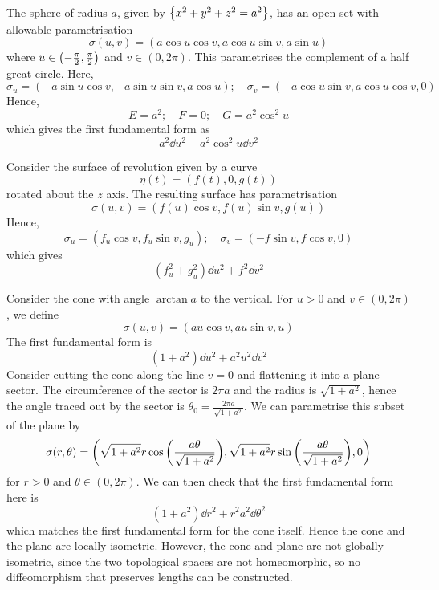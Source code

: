 \documentclass[a4paper,11pt]{article}
\begin{document}
\begin{example}
	The sphere of radius \( a \), given by \( \qty{x^2 + y^2 + z^2 = a^2} \), has an open set with allowable parametrisation
	\[
		\sigma(u,v) = (a\cos u \cos v, a \cos u \sin v, a \sin u)
	\]
	where \( u \in \qty(-\frac{\pi}{2}, \frac{\pi}{2}) \) and \( v \in (0,2\pi) \).
	This parametrises the complement of a half great circle.
	Here,
	\[
		\sigma_u = (-a \sin u \cos v, -a \sin u \sin v, a \cos u);\quad \sigma_v = (-a \cos u \sin v, a \cos u \cos v, 0)
	\]
	Hence,
	\[
		E = a^2; \quad F = 0;\quad G = a^2 \cos^2 u
	\]
	which gives the first fundamental form as
	\[
		a^2 \dd{u}^2 + a^2 \cos^2 u \dd{v}^2
	\]
\end{example}
\begin{example}
	Consider the surface of revolution given by a curve
	\[
		\eta(t) = (f(t),0,g(t))
	\]
	rotated about the \( z \) axis.
	The resulting surface has parametrisation
	\[
		\sigma(u,v) = (f(u) \cos v, f(u) \sin v, g(u))
	\]
	Hence,
	\[
		\sigma_u = (f_u \cos v, f_u \sin v, g_u);\quad \sigma_v = (-f \sin v, f \cos v, 0)
	\]
	which gives
	\[
		(f_u^2 + g_u^2) \dd{u}^2 + f^2 \dd{v}^2
	\]
\end{example}
\begin{example}
	Consider the cone with angle \( \arctan a \) to the vertical.
	For \( u > 0 \) and \( v \in (0,2\pi) \), we define
	\[
		\sigma(u,v) = (au\cos v, au\sin v, u)
	\]
	The first fundamental form is
	\[
		(1+a^2)\dd{u}^2 + a^2 u^2 \dd{v}^2
	\]
	Consider cutting the cone along the line \( v = 0 \) and flattening it into a plane sector.
	The circumference of the sector is \( 2 \pi a \) and the radius is \( \sqrt{1+a^2} \), hence the angle traced out by the sector is \( \theta_0 = \frac{2 \pi a}{\sqrt{1+a^2}} \).
	We can parametrise this subset of the plane by
	\[
		\sigma(r,\theta) = \qty(\sqrt{1+a^2} r\cos\qty(\frac{a\theta}{\sqrt{1+a^2}}), \sqrt{1+a^2} r\sin\qty(\frac{a\theta}{\sqrt{1+a^2}}), 0)
	\]
	for \( r > 0 \) and \( \theta \in (0,2\pi) \).
	We can then check that the first fundamental form here is
	\[
		(1+a^2) \dd{r}^2 + r^2 a^2 \dd{\theta}^2
	\]
	which matches the first fundamental form for the cone itself.
	Hence the cone and the plane are locally isometric.
	However, the cone and plane are not globally isometric, since the two topological spaces are not homeomorphic, so no diffeomorphism that preserves lengths can be constructed.
\end{example}
\end{document}
